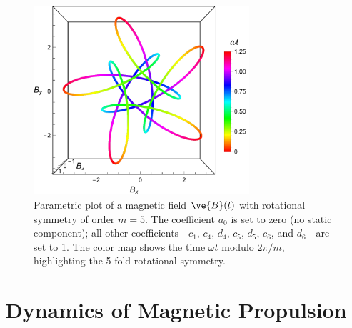 \begin{figure}[h]
    \centering
    \includegraphics[width=8cm]{figures/5_1.pdf}
    \caption{Parametric plot of a magnetic field $\ve{B}(t)$ with rotational symmetry of order $m=5$. The coefficient $a_0$ is set to zero (no static component); all other coefficients---$c_1$, $c_4$, $d_4$, $c_5$, $d_5$, $c_6$, and $d_6$---are set to 1. The color map shows the time $\omega t$ modulo $2\pi/m$, highlighting the 5-fold rotational symmetry.}
    \label{fig:field5}
\end{figure}

\section{Dynamics of Magnetic Propulsion}

